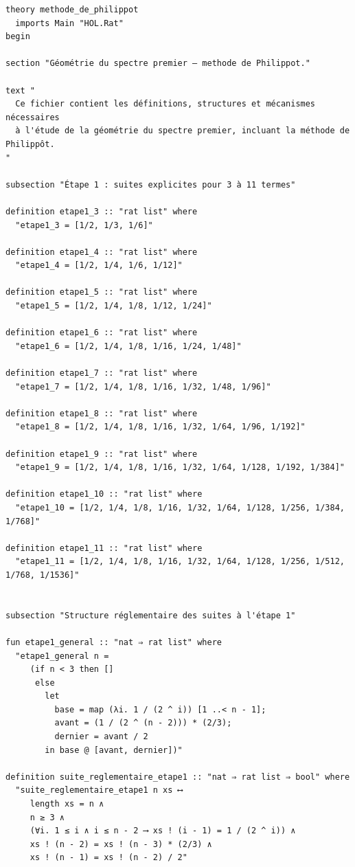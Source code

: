 \documentclass[a4paper,11pt]{article}
\begin{document}
\begin{holcode}[title={\textcolor{white}{Fichier : methode\_de\_philippot.thy -- COMPLET}}]
\begin{lstlisting}
theory methode_de_philippot
  imports Main "HOL.Rat"
begin

section "Géométrie du spectre premier – methode de Philippot."

text "
  Ce fichier contient les définitions, structures et mécanismes nécessaires
  à l'étude de la géométrie du spectre premier, incluant la méthode de Philippôt.
"

subsection "Étape 1 : suites explicites pour 3 à 11 termes"

definition etape1_3 :: "rat list" where
  "etape1_3 = [1/2, 1/3, 1/6]"

definition etape1_4 :: "rat list" where
  "etape1_4 = [1/2, 1/4, 1/6, 1/12]"

definition etape1_5 :: "rat list" where
  "etape1_5 = [1/2, 1/4, 1/8, 1/12, 1/24]"

definition etape1_6 :: "rat list" where
  "etape1_6 = [1/2, 1/4, 1/8, 1/16, 1/24, 1/48]"

definition etape1_7 :: "rat list" where
  "etape1_7 = [1/2, 1/4, 1/8, 1/16, 1/32, 1/48, 1/96]"

definition etape1_8 :: "rat list" where
  "etape1_8 = [1/2, 1/4, 1/8, 1/16, 1/32, 1/64, 1/96, 1/192]"

definition etape1_9 :: "rat list" where
  "etape1_9 = [1/2, 1/4, 1/8, 1/16, 1/32, 1/64, 1/128, 1/192, 1/384]"

definition etape1_10 :: "rat list" where
  "etape1_10 = [1/2, 1/4, 1/8, 1/16, 1/32, 1/64, 1/128, 1/256, 1/384, 1/768]"

definition etape1_11 :: "rat list" where
  "etape1_11 = [1/2, 1/4, 1/8, 1/16, 1/32, 1/64, 1/128, 1/256, 1/512, 1/768, 1/1536]"


subsection "Structure réglementaire des suites à l'étape 1"

fun etape1_general :: "nat ⇒ rat list" where
  "etape1_general n =
     (if n < 3 then []
      else
        let
          base = map (λi. 1 / (2 ^ i)) [1 ..< n - 1];
          avant = (1 / (2 ^ (n - 2))) * (2/3);
          dernier = avant / 2
        in base @ [avant, dernier])"

definition suite_reglementaire_etape1 :: "nat ⇒ rat list ⇒ bool" where
  "suite_reglementaire_etape1 n xs ⟷
     length xs = n ∧
     n ≥ 3 ∧
     (∀i. 1 ≤ i ∧ i ≤ n - 2 ⟶ xs ! (i - 1) = 1 / (2 ^ i)) ∧
     xs ! (n - 2) = xs ! (n - 3) * (2/3) ∧
     xs ! (n - 1) = xs ! (n - 2) / 2"



\end{lstlisting}
\end{holcode}
\end{document}
